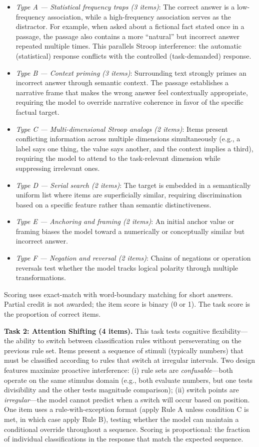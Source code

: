 \documentclass{article}
\begin{document}
\begin{itemize}
    \item \emph{Type A --- Statistical frequency traps (3 items)}: The correct answer is a low-frequency association, while a high-frequency association serves as the distractor. For example, when asked about a fictional fact stated once in a passage, the passage also contains a more ``natural'' but incorrect answer repeated multiple times. This parallels Stroop interference: the automatic (statistical) response conflicts with the controlled (task-demanded) response.
    \item \emph{Type B --- Context priming (3 items)}: Surrounding text strongly primes an incorrect answer through semantic context. The passage establishes a narrative frame that makes the wrong answer feel contextually appropriate, requiring the model to override narrative coherence in favor of the specific factual target.
    \item \emph{Type C --- Multi-dimensional Stroop analogs (2 items)}: Items present conflicting information across multiple dimensions simultaneously (e.g., a label says one thing, the value says another, and the context implies a third), requiring the model to attend to the task-relevant dimension while suppressing irrelevant ones.
    \item \emph{Type D --- Serial search (2 items)}: The target is embedded in a semantically uniform list where items are superficially similar, requiring discrimination based on a specific feature rather than semantic distinctiveness.
    \item \emph{Type E --- Anchoring and framing (2 items)}: An initial anchor value or framing biases the model toward a numerically or conceptually similar but incorrect answer.
    \item \emph{Type F --- Negation and reversal (2 items)}: Chains of negations or operation reversals test whether the model tracks logical polarity through multiple transformations.
\end{itemize}

Scoring uses exact-match with word-boundary matching for short answers. Partial credit is not awarded; the item score is binary (0 or 1). The task score is the proportion of correct items.

\textbf{Task 2: Attention Shifting (4 items).} This task tests cognitive flexibility---the ability to switch between classification rules without perseverating on the previous rule set. Items present a sequence of stimuli (typically numbers) that must be classified according to rules that switch at irregular intervals. Two design features maximize proactive interference: (i) rule sets are \emph{confusable}---both operate on the same stimulus domain (e.g., both evaluate numbers, but one tests divisibility and the other tests magnitude comparison); (ii) switch points are \emph{irregular}---the model cannot predict when a switch will occur based on position. One item uses a rule-with-exception format (apply Rule A unless condition C is met, in which case apply Rule B), testing whether the model can maintain a conditional override throughout a sequence. Scoring is proportional: the fraction of individual classifications in the response that match the expected sequence.
\end{document}

